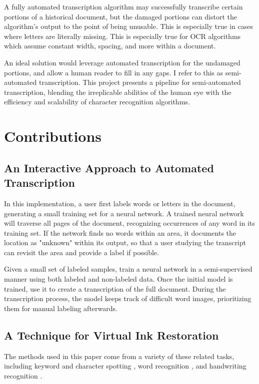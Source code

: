 \documentclass[final]{ukthesis}
\begin{document}
A fully automated transcription algorithm may successfully transcribe certain portions of a historical document, but the damaged portions can distort the algorithm's output to the point of being unusable. This is especially true in cases where letters are literally missing. This is especially true for OCR algorithms which assume constant width, spacing, and more within a document.

An ideal solution would leverage automated transcription for the undamaged portions, and allow a human reader to fill in any gaps. I refer to this as semi-automated transcription. This project presents a pipeline for semi-automated transcription, blending the irreplicable abilities of the human eye with the efficiency and scalability of character recognition algorithms.


\section{Contributions}

\subsection{An Interactive Approach to Automated Transcription}
In this implementation, a user first labels words or letters in the document, generating a small training set for a neural network. A trained neural network will traverse all pages of the document, recognizing occurrences of any word in its training set. If the network finds no words within an area, it documents the location as "unknown" within its output, so that a user studying the transcript can revisit the area and provide a label if possible.

Given a small set of labeled samples, train a neural network in a semi-supervised manner using both labeled and non-labeled data. Once the initial model is trained, use it to create a transcription of the full document. During the transcription process, the model keeps track of difficult word images, prioritizing them for manual labeling afterwards.

\subsection{A Technique for Virtual Ink Restoration}
The methods used in this paper come from a variety of these related tasks, including keyword and character spotting \cite{sharma2015adapting,frinken2012novel}, word recognition \cite{howe2009finding}, and handwriting recognition \cite{fischer2013fast,bluche2013feature}.
\end{document}
